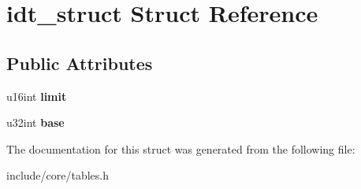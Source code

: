 \hypertarget{structidt__struct}{}\section{idt\+\_\+struct Struct Reference}
\label{structidt__struct}
\subsection*{Public Attributes}
\begin{DoxyCompactItemize}
\item 
u16int {\bfseries limit}\hypertarget{structidt__struct_aa75e2805e21db1a33816af778263d712}{}\label{structidt__struct_aa75e2805e21db1a33816af778263d712}

\item 
u32int {\bfseries base}\hypertarget{structidt__struct_a1a91fe2ab44ad8dfbad0f6d07ec789ea}{}\label{structidt__struct_a1a91fe2ab44ad8dfbad0f6d07ec789ea}

\end{DoxyCompactItemize}


The documentation for this struct was generated from the following file\+:\begin{DoxyCompactItemize}
\item 
include/core/tables.\+h\end{DoxyCompactItemize}
